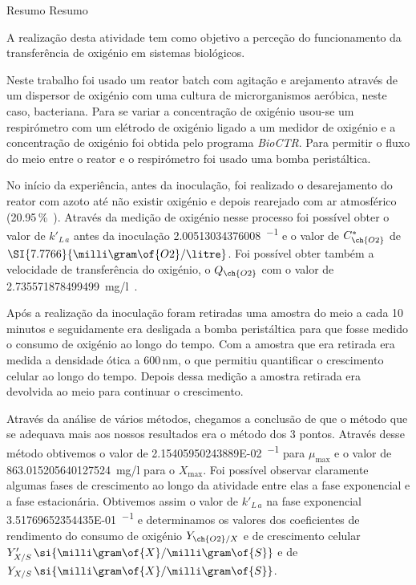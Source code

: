 \documentclass[\mainfilename]{subfiles}
\begin{document}

{Resumo} %
{Resumo} %

A realização desta atividade tem como objetivo a perceção do funcionamento da transferência de oxigénio em sistemas biológicos.\par
Neste trabalho foi usado um reator batch com agitação e arejamento através de um dispersor de oxigénio com uma cultura de microrganismos aeróbica, neste caso, bacteriana. Para se variar a concentração de oxigénio usou-se um respirómetro com um elétrodo de oxigénio ligado a um medidor de oxigénio e a concentração de oxigénio foi obtida pelo programa \textit{BioCTR}. Para permitir o fluxo do meio entre o reator e o respirómetro foi usado uma bomba peristáltica.\par
No início da experiência, antes da inoculação, foi realizado o desarejamento do reator com azoto até não existir oxigénio e depois rearejado com ar atmosférico (20.95\,\si{\percent{}}). Através da medição de oxigénio nesse processo foi possível obter o valor de \(k'_{L\,a}\) antes da inoculação \SI{2.00513034376008}{\min^{-1}} e o valor de \(C^*_{\ch{O2}}\) de \(\SI{7.7766}{\milli\gram\of{O2}/\litre}\). Foi possível obter também a velocidade de transferência do oxigénio, o \(Q_{\ch{O2}}\) com o valor de \SI{2.735571878499499}{\milli\gram/\litre.\min}.\par
Após a realização da inoculação foram retiradas uma amostra do meio a cada 10 minutos e seguidamente era desligada a bomba peristáltica para que fosse medido o consumo de oxigénio ao longo do tempo. Com a amostra que era retirada era medida a densidade ótica a 600\,\si{\nano\metre}, o que permitiu quantificar o crescimento celular ao longo do tempo. Depois dessa medição a amostra retirada era devolvida ao meio para continuar o crescimento.\par
Através da análise de vários métodos, chegamos a conclusão de que o método que se adequava mais aos nossos resultados era o método dos 3 pontos. Através desse método obtivemos o valor de \SI{2.15405950243889E-02}{\min^{-1}} para \(\mu_{\max}\) e o valor de \SI{863.015205640127524}{\milli\gram/\litre} para o \(X_{\max}\). 
Foi possível observar claramente algumas fases de crescimento ao longo da atividade entre elas a fase exponencial e a fase estacionária. Obtivemos assim o valor de \(k'_{L\,a}\) na fase exponencial \SI{3.51769652354435E-01}{\min^{-1}} e determinamos os valores dos coeficientes de rendimento do consumo de oxigénio \(Y_{\ch{O2}/X}\) e de crescimento celular \(Y'_{X/S}\,\si{\milli\gram\of{X}/\milli\gram\of{S}}\) e de \(Y_{X/S}\,\si{\milli\gram\of{X}/\milli\gram\of{S}}\).
\end{document}
